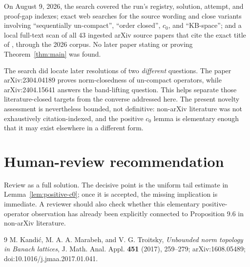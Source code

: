 \documentclass[11pt]{article}
\begin{document}
On August 9, 2026, the search covered the run's registry, solution, attempt,
and proof-gap indexes; exact web searches for the source wording and close
variants involving ``sequentially un-compact'', ``order closed'', $c_0$, and
``KB-space''; and a local full-text scan of all 43 ingested arXiv source papers
that cite the exact title of \cite{KMT}, through the 2026 corpus. No later
paper stating or proving Theorem~\ref{thm:main} was found.

The search did locate later resolutions of two \emph{different} questions.
The paper arXiv:2304.04189 proves norm-closedness of un-compact operators,
while arXiv:2404.15641 answers the band-lifting question. This helps
separate those literature-closed targets from the converse addressed here.
The present novelty assessment is nevertheless bounded, not definitive:
non-arXiv literature was not exhaustively citation-indexed, and the positive
$c_0$ lemma is elementary enough that it may exist elsewhere in a different
form.

\section*{Human-review recommendation}

Review as a full solution. The decisive point is the uniform tail estimate in
Lemma~\ref{lem:positive-c0}; once it is accepted, the missing implication is
immediate. A reviewer should also check whether this elementary positive-
operator observation has already been explicitly connected to Proposition
9.6 in non-arXiv literature.

\begin{thebibliography}{9}
M. Kandi\'c, M. A. A. Marabeh, and V. G. Troitsky,
\emph{Unbounded norm topology in Banach lattices},
J. Math. Anal. Appl. \textbf{451} (2017), 259--279;
arXiv:1608.05489; doi:10.1016/j.jmaa.2017.01.041.
\end{thebibliography}
\end{document}
